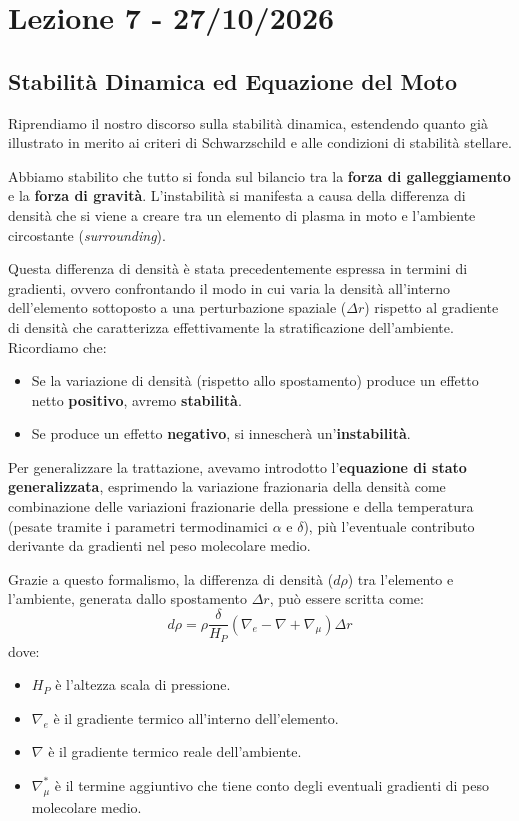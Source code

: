 \chapter{Lezione 7 - 27/10/2026}

\section{Stabilità Dinamica ed Equazione del Moto}

Riprendiamo il nostro discorso sulla stabilità dinamica, estendendo quanto già illustrato in merito ai criteri di Schwarzschild e alle condizioni di stabilità stellare.

Abbiamo stabilito che tutto si fonda sul bilancio tra la \textbf{forza di galleggiamento} e la \textbf{forza di gravità}. L'instabilità si manifesta a causa della differenza di densità che si viene a creare tra un elemento di plasma in moto e l'ambiente circostante (\textit{surrounding}).

Questa differenza di densità è stata precedentemente espressa in termini di gradienti, ovvero confrontando il modo in cui varia la densità all'interno dell'elemento sottoposto a una perturbazione spaziale ($\Delta r$) rispetto al gradiente di densità che caratterizza effettivamente la stratificazione dell'ambiente.
Ricordiamo che:
\begin{itemize}
\item Se la variazione di densità (rispetto allo spostamento) produce un effetto netto \textbf{positivo}, avremo \textbf{stabilità}.
\item Se produce un effetto \textbf{negativo}, si innescherà un'\textbf{instabilità}.
\end{itemize}

Per generalizzare la trattazione, avevamo introdotto l'\textbf{equazione di stato generalizzata}, esprimendo la variazione frazionaria della densità come combinazione delle variazioni frazionarie della pressione e della temperatura (pesate tramite i parametri termodinamici $\alpha$ e $\delta$), più l'eventuale contributo derivante da gradienti nel peso molecolare medio.

Grazie a questo formalismo, la differenza di densità ($d\rho$) tra l'elemento e l'ambiente, generata dallo spostamento $\Delta r$, può essere scritta come:
\begin{equation}
d\rho = \rho \frac{\delta}{H_P} \left( \nabla_e - \nabla + \nabla_\mu \right) \Delta r
\end{equation}
dove:
\begin{itemize}
\item $H_P$ è l'altezza scala di pressione.
\item $\nabla_e$ è il gradiente termico all'interno dell'elemento.
\item $\nabla$ è il gradiente termico reale dell'ambiente.
\item $\nabla_\mu^*$ è il termine aggiuntivo che tiene conto degli eventuali gradienti di peso molecolare medio.
\end{itemize}

